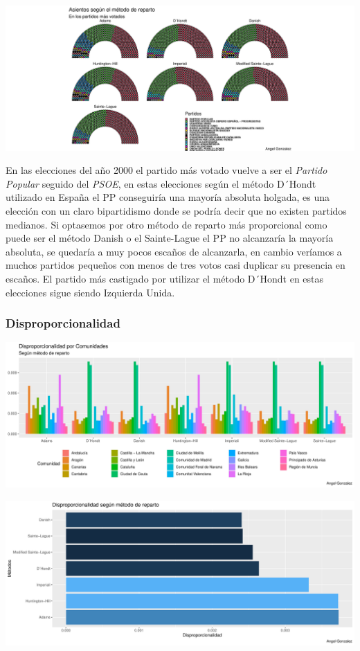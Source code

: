 \documentclass[12pt,a4paper,]{book}
\numberwithin{dummy}{section}
\theoremstyle{ocrenumbox}
\theoremstyle{blacknumex}
\theoremstyle{blacknumbox}
\theoremstyle{ocrenum}
\theoremstyle{ocrenum}
\begin{document}
\begin{center}\includegraphics[width=0.95\linewidth]{figurasR/unnamed-chunk-122-3} \end{center}

En las elecciones del año 2000 el partido más votado vuelve a ser el
\emph{Partido Popular} seguido del \emph{PSOE}, en estas elecciones
según el método D´Hondt utilizado en España el PP conseguiría una
mayoría absoluta holgada, es una elección con un claro bipartidismo
donde se podría decir que no existen partidos medianos. Si optasemos por
otro método de reparto más proporcional como puede ser el método Danish
o el Sainte-Lague el PP no alcanzaría la mayoría absoluta, se quedaría a
muy pocos escaños de alcanzarla, en cambio veríamos a muchos partidos
pequeños con menos de tres votos casi duplicar su presencia en escaños.
El partido más castigado por utilizar el método D´Hondt en estas
elecciones sigue siendo Izquierda Unida.

\hypertarget{disproporcionalidad-7}{%
\subsubsection{Disproporcionalidad}\label{disproporcionalidad-7}}

\begin{center}\includegraphics[width=0.95\linewidth]{figurasR/unnamed-chunk-123-1} \end{center}

\begin{center}\includegraphics[width=0.95\linewidth]{figurasR/unnamed-chunk-123-2} \end{center}
\end{document}
